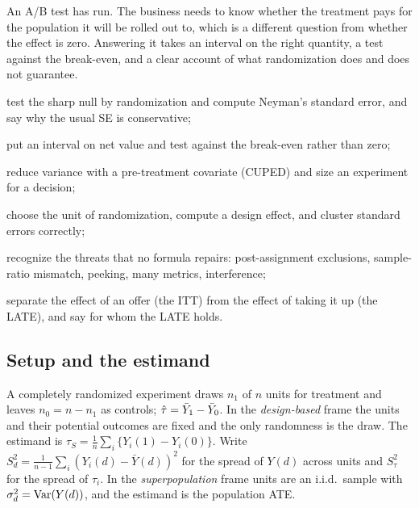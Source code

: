 \documentclass[11pt]{article}
\begin{document}

\begin{decision}
An A/B test has run. The business needs to know whether the treatment pays for the population it will be
rolled out to, which is a different question from whether the effect is zero. Answering it takes an interval
on the right quantity, a test against the break-even, and a clear account of what randomization does and
does not guarantee.
\end{decision}

\begin{goals}
  \item test the sharp null by randomization and compute Neyman's standard error, and say why the usual SE
  is conservative;
  \item put an interval on net value and test against the break-even rather than zero;
  \item reduce variance with a pre-treatment covariate (CUPED) and size an experiment for a decision;
  \item choose the unit of randomization, compute a design effect, and cluster standard errors correctly;
  \item recognize the threats that no formula repairs: post-assignment exclusions, sample-ratio mismatch,
  peeking, many metrics, interference;
  \item separate the effect of an offer (the ITT) from the effect of taking it up (the LATE), and say for whom the
  LATE holds.
\end{goals}

\sectionone

\subsection{Setup and the estimand}

A completely randomized experiment draws $n_1$ of $n$ units for treatment and leaves $n_0 = n - n_1$ as
controls; $\hat{\tau} = \bar Y_1 - \bar Y_0$. In the \emph{design-based} frame the units and their potential
outcomes are fixed and the only randomness is the draw. The estimand is
$\tau_S = \frac1n\sum_i \{Y_i(1) - Y_i(0)\}$. Write
$S_d^2 = \frac{1}{n-1}\sum_i (Y_i(d) - \bar Y(d))^2$ for the spread of $Y(d)$ across units and $S_\tau^2$ for
the spread of $\tau_i$. In the \emph{superpopulation} frame units are an i.i.d.\ sample with
$\sigma_d^2 = \operatorname{Var}(Y(d))$, and the estimand is the population ATE.
\end{document}
